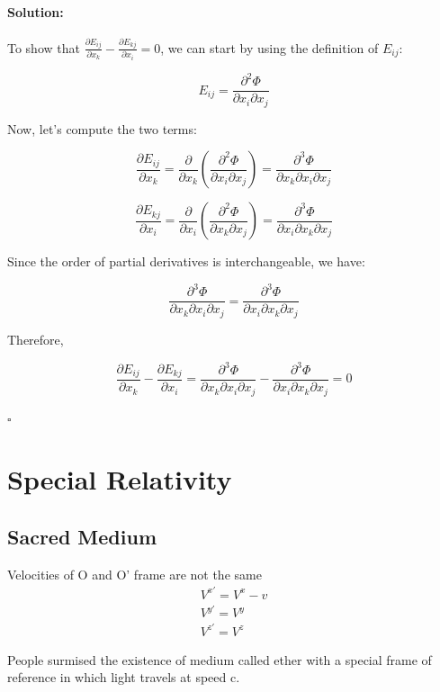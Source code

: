 \documentclass{article}
\newenvironment{solution}{\paragraph{Solution:}}{\hfill$\square$}
\begin{document}
\begin{solution}
    To show that $\frac{\partial E_{ij}}{\partial x_k} - \frac{\partial E_{kj}}{\partial x_i} = 0$, we can start by using the definition of $E_{ij}$:


$$E_{ij} = \frac{\partial^2 \Phi}{\partial x_i \partial x_j}$$


Now, let's compute the two terms:


$$\frac{\partial E_{ij}}{\partial x_k} = \frac{\partial}{\partial x_k} \left( \frac{\partial^2 \Phi}{\partial x_i \partial x_j} \right) = \frac{\partial^3 \Phi}{\partial x_k \partial x_i \partial x_j}$$


$$\frac{\partial E_{kj}}{\partial x_i} = \frac{\partial}{\partial x_i} \left( \frac{\partial^2 \Phi}{\partial x_k \partial x_j} \right) = \frac{\partial^3 \Phi}{\partial x_i \partial x_k \partial x_j}$$


Since the order of partial derivatives is interchangeable, we have:


$$\frac{\partial^3 \Phi}{\partial x_k \partial x_i \partial x_j} = \frac{\partial^3 \Phi}{\partial x_i \partial x_k \partial x_j}$$


Therefore,


$$\frac{\partial E_{ij}}{\partial x_k} - \frac{\partial E_{kj}}{\partial x_i} = \frac{\partial^3 \Phi}{\partial x_k \partial x_i \partial x_j} - \frac{\partial^3 \Phi}{\partial x_i \partial x_k \partial x_j} = 0$$

\end{solution}

\section{Special Relativity }
\subsection{Sacred Medium}
Velocities of O and O' frame are not the same 
    \begin{align*}
        V^{x'} = V^{x} -v \\
        V^{y'} = V^y \\
        V^{z'} = V^z 
    \end{align*}
 
People surmised the existence of medium called ether with a special frame of reference in which light travels at speed c.
\end{document}
